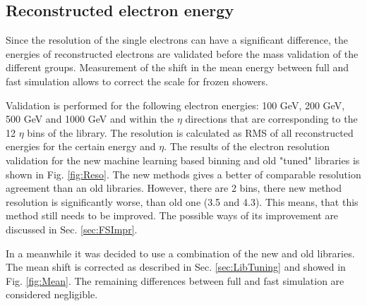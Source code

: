\subsection{Reconstructed electron energy}

Since the resolution of the single electrons can have a significant difference, the energies of reconstructed electrons are validated before the mass validation of the different groups. Measurement of the shift in the mean energy between full and fast simulation allows to correct the scale for frozen showers.

Validation is performed for the following electron energies: 100 GeV, 200 GeV, 500 GeV and 1000 GeV and within the $\eta$ directions that are corresponding to the 12 $\eta$ bins of the library. The resolution is calculated as RMS of all reconstructed energies for the certain energy and $\eta$. The results of the electron resolution validation for the new machine learning based binning and old "tuned" libraries is shown in Fig. \ref{fig:Reso}. The new methods gives a better of comparable resolution agreement than an old libraries. However, there are 2 bins, there new method resolution is significantly worse, than old one (3.5 and 4.3). This means, that this method still needs to be improved. The possible ways of its improvement are discussed in Sec. \ref{sec:FSImpr}.

In a meanwhile it was decided to use a combination of the new and old libraries. The mean shift is corrected as described in Sec. \ref{sec:LibTuning} and showed in Fig. \ref{fig:Mean}. The remaining differences between full and fast simulation are considered negligible.


